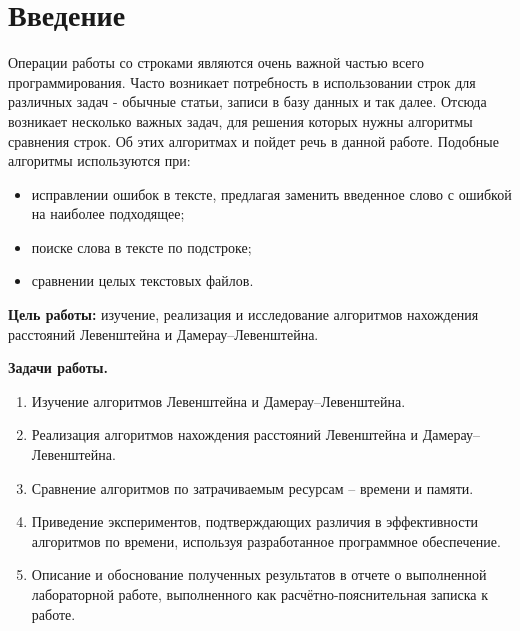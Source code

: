 \chapter*{Введение}

Операции работы со строками являются очень важной частью всего программирования. Часто возникает потребность в использовании строк для различных задач - обычные статьи, записи в базу данных и так далее. Отсюда возникает несколько важных задач, для решения которых нужны алгоритмы сравнения строк. Об этих алгоритмах и пойдет речь в данной работе. 
Подобные алгоритмы используются при:
\begin{itemize}
	\item исправлении ошибок в тексте, предлагая заменить введенное слово с ошибкой на наиболее подходящее;
    \item поиске слова в тексте по подстроке;
    \item сравнении целых текстовых файлов. \newline
\end{itemize}



\textbf{Цель работы:} изучение, реализация и исследование алгоритмов нахождения расстояний Левенштейна и Дамерау--Левенштейна. \newline

\textbf{Задачи работы.}
\begin{enumerate}
	\item Изучение алгоритмов Левенштейна и Дамерау--Левенштейна.
    \item Реализация алгоритмов нахождения расстояний Левенштейна и Дамерау--Левенштейна.
    \item Сравнение алгоритмов по затрачиваемым ресурсам -- времени и памяти.
    \item Приведение экспериментов, подтверждающих различия в эффективности алгоритмов по времени, используя разработанное программное обеспечение.
	\item Описание и обоснование полученных результатов в отчете о выполненной лабораторной работе, выполненного как расчётно-пояснительная записка к работе.
\end{enumerate}
